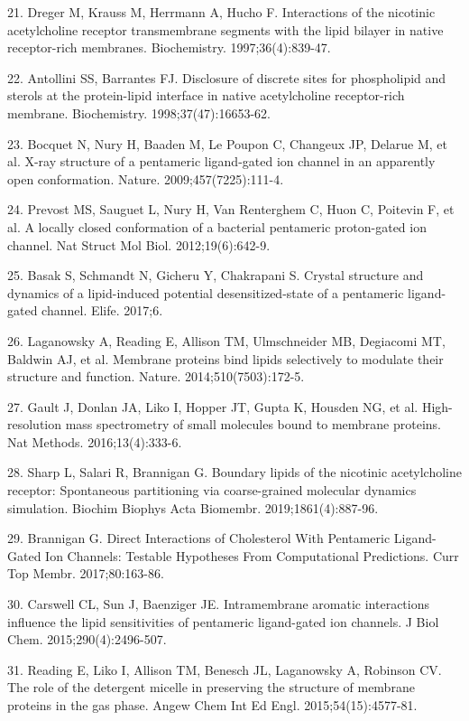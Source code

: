 21. Dreger M, Krauss M, Herrmann A, Hucho F. Interactions of the
nicotinic acetylcholine receptor transmembrane segments with the lipid
bilayer in native receptor-rich membranes. Biochemistry.
1997;36(4):839-47.

22. Antollini SS, Barrantes FJ. Disclosure of discrete sites for
phospholipid and sterols at the protein-lipid interface in native
acetylcholine receptor-rich membrane. Biochemistry.
1998;37(47):16653-62.

23. Bocquet N, Nury H, Baaden M, Le Poupon C, Changeux JP, Delarue M, et
al. X-ray structure of a pentameric ligand-gated ion channel in an
apparently open conformation. Nature. 2009;457(7225):111-4.

24. Prevost MS, Sauguet L, Nury H, Van Renterghem C, Huon C, Poitevin F,
et al. A locally closed conformation of a bacterial pentameric
proton-gated ion channel. Nat Struct Mol Biol. 2012;19(6):642-9.

25. Basak S, Schmandt N, Gicheru Y, Chakrapani S. Crystal structure and
dynamics of a lipid-induced potential desensitized-state of a pentameric
ligand-gated channel. Elife. 2017;6.

26. Laganowsky A, Reading E, Allison TM, Ulmschneider MB, Degiacomi MT,
Baldwin AJ, et al. Membrane proteins bind lipids selectively to modulate
their structure and function. Nature. 2014;510(7503):172-5.

27. Gault J, Donlan JA, Liko I, Hopper JT, Gupta K, Housden NG, et al.
High-resolution mass spectrometry of small molecules bound to membrane
proteins. Nat Methods. 2016;13(4):333-6.

28. Sharp L, Salari R, Brannigan G. Boundary lipids of the nicotinic
acetylcholine receptor: Spontaneous partitioning via coarse-grained
molecular dynamics simulation. Biochim Biophys Acta Biomembr.
2019;1861(4):887-96.

29. Brannigan G. Direct Interactions of Cholesterol With Pentameric
Ligand-Gated Ion Channels: Testable Hypotheses From Computational
Predictions. Curr Top Membr. 2017;80:163-86.

30. Carswell CL, Sun J, Baenziger JE. Intramembrane aromatic
interactions influence the lipid sensitivities of pentameric
ligand-gated ion channels. J Biol Chem. 2015;290(4):2496-507.

31. Reading E, Liko I, Allison TM, Benesch JL, Laganowsky A, Robinson
CV. The role of the detergent micelle in preserving the structure of
membrane proteins in the gas phase. Angew Chem Int Ed Engl.
2015;54(15):4577-81.

